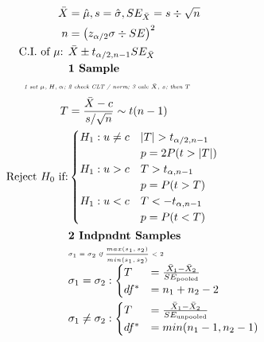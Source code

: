\documentclass{article}
\newcommand{\note}[1]{\tiny\smash{\textit{#1}}}
\begin{document}
\begin{minipage}{0.48\textwidth}
	\begin{align*}
		\bar{X} &= \hat{\mu}
			, s = \hat{\sigma} 
			, SE_{\bar{X}} = s \div \sqrt{n} \\
		n &= \left( z_{\alpha / 2} \sigma \div SE \right)^2 \\
		\text{C.I. of $\mu$: }& \bar{X} \pm t_{\alpha / 2, n - 1} SE_{\bar{X}} \\
		&\textbf{1 Sample} \\
		\note{1 set $\mu, H, \alpha$; }
		&\note{2 check CLT / norm; }
		\note{3 calc $\bar{X}$, $s$; then $T$}
		\\
		T &= \frac{
			\bar{X} - c
		}{
			s / \sqrt{n}
		} \sim t(n-1) \\
		\text{Reject $H_0$ if:}&
		\begin{cases}
			H_1 : u \ne c & |T| > t_{\alpha / 2 , n - 1} \\
				& p = 2 P(t > |T|) \\
			H_1 : u > c & T > t_{\alpha , n - 1} \\
				& p = P(t > T) \\
			H_1 : u < c & T < - t_{\alpha , n - 1} \\
				& p = P(t < T)
		\end{cases} \\
		&\textbf{2 Indpndnt Samples} \\
		&\note{$\sigma_1 = \sigma_2 \text{ if } \frac{ max(s_1, s_2) }{ min(s_1, s_2) } < 2$} \\
		&\begin{aligned}
			\sigma_1 = \sigma_2 &:
			\begin{cases}
				T &= \frac{\bar{X}_1 - \bar{X}_2}{SE_{\text{pooled}}}
				\\
				df^* &= n_1 + n_2 - 2
			\end{cases}
			\\
			\sigma_1 \ne \sigma_2 &:
			\begin{cases}
				T &= \frac{\bar{X}_1 - \bar{X}_2}{SE_{\text{unpooled}}}
				\\
				df^* &= min(n_1 - 1, n_2 - 1)
			\end{cases}
		\end{aligned} \\
	\end{align*}
\end{minipage}
\end{document}
